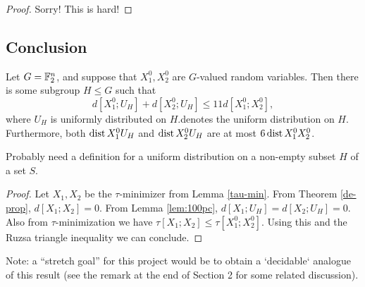 \begin{proof}  Sorry!  This is hard!
\end{proof}


\subsection{Conclusion}

\begin{theorem}\label{entropy-pfr}
  Let $G = \mathbb{F}_2^n$, and suppose that $X^0_1, X^0_2$ are $G$-valued random variables.
  Then there is some subgroup $H \leq G$ such that
  \[
    d[X^0_1;U_H] + d[X^0_2;U_H] \le 11 d[X^0_1;X^0_2],
  \]
  where $U_H$ is uniformly distributed on $H$.denotes the uniform distribution on $H$.
  Furthermore, both $\operatorname{dist}{X^0_1}{U_H}$ and $\operatorname{dist}{X^0_2}{U_H}$ are at most $6 \operatorname{dist}{X^0_1}{X^0_2}$.
\end{theorem}

Probably need a definition for a uniform distribution on a non-empty subset $H$ of a set $S$.

\begin{proof}   Let $X_1, X_2$ be the $\tau$-minimizer from Lemma \ref{tau-min}.  From Theorem \ref{de-prop}, $d[X_1;X_2]=0$.  From Lemma \ref{lem:100pc}, $d[X_1;U_H] = d[X_2; U_H] = 0$.  Also from $\tau$-minimization we have $\tau[X_1;X_2] \leq \tau[X^0_1;X^0_2]$.  Using this and the Ruzsa triangle inequality we can conclude.
\end{proof}

Note: a ``stretch goal'' for this project would be to obtain a `decidable` analogue of this result (see the remark at the end of Section 2 for some related discussion).
